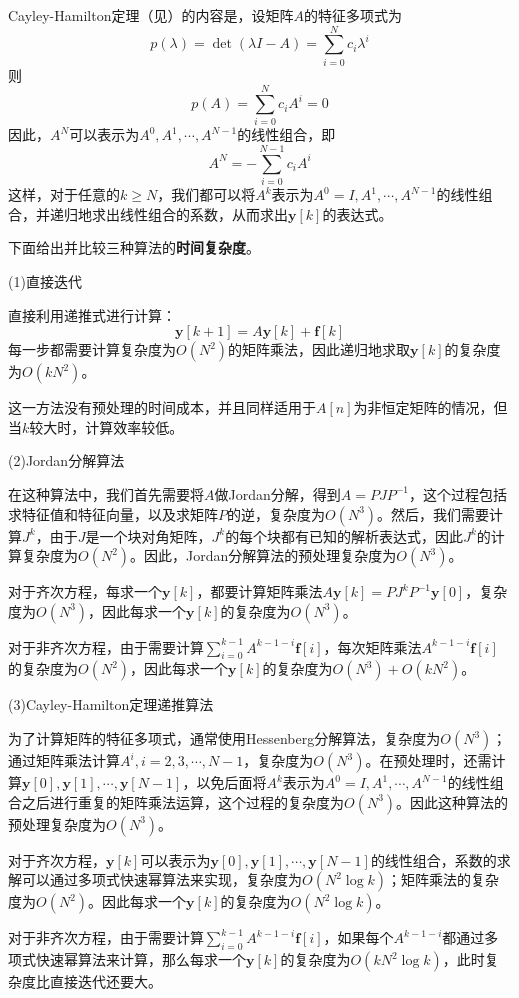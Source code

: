 Cayley-Hamilton定理（见）的内容是，设矩阵$A$的特征多项式为
$$p(\lambda)=\det(\lambda I - A)=\sum_{i=0}^{N} c_i \lambda^i$$
则
$$p(A)=\sum_{i=0}^{N} c_i A^i=0$$
因此，$A^N$可以表示为$A^0,A^1,\cdots,A^{N-1}$的线性组合，即
$$A^N = -\sum_{i=0}^{N-1} c_i A^i$$
这样，对于任意的$k\geq N$，我们都可以将$A^k$表示为$A^0=I,A^1,\cdots,A^{N-1}$的线性组合，并递归地求出线性组合的系数，从而求出$\mathbf{y}[k]$的表达式。

下面给出并比较三种算法的\textbf{时间复杂度}。

(1)直接迭代

直接利用递推式进行计算：
$$\mathbf{y}[k+1] = A \mathbf{y}[k] + \mathbf{f}[k]$$
每一步都需要计算复杂度为$O(N^2)$的矩阵乘法，因此递归地求取$\mathbf{y}[k]$的复杂度为$O(k N^2)$。

这一方法没有预处理的时间成本，并且同样适用于$A[n]$为非恒定矩阵的情况，但当$k$较大时，计算效率较低。

(2)Jordan分解算法

在这种算法中，我们首先需要将$A$做Jordan分解，得到$A=PJP^{-1}$，这个过程包括求特征值和特征向量，以及求矩阵$P$的逆，复杂度为$O(N^3)$。然后，我们需要计算$J^k$，由于$J$是一个块对角矩阵，$J^k$的每个块都有已知的解析表达式，因此$J^k$的计算复杂度为$O(N^2)$。因此，Jordan分解算法的预处理复杂度为$O(N^3)$。

对于齐次方程，每求一个$\mathbf{y}[k]$，都要计算矩阵乘法$A\mathbf{y}[k] = P J^k P^{-1} \mathbf{y}[0]$，复杂度为$O(N^3)$，因此每求一个$\mathbf{y}[k]$的复杂度为$O(N^3)$。

对于非齐次方程，由于需要计算$\sum_{i=0}^{k-1} A^{k-1-i} \mathbf{f}[i]$，每次矩阵乘法$A^{k-1-i} \mathbf{f}[i]$的复杂度为$O(N^2)$，因此每求一个$\mathbf{y}[k]$的复杂度为$O(N^3)+O(k N^2)$。

(3)Cayley-Hamilton定理递推算法

为了计算矩阵的特征多项式，通常使用Hessenberg分解算法，复杂度为$O(N^3)$；通过矩阵乘法计算$A^i,i=2,3,\cdots,N-1$，复杂度为$O(N^3)$。在预处理时，还需计算$\mathbf{y}[0],\mathbf{y}[1],\cdots,\mathbf{y}[N-1]$，以免后面将$A^k$表示为$A^0=I,A^1,\cdots,A^{N-1}$的线性组合之后进行重复的矩阵乘法运算，这个过程的复杂度为$O(N^3)$。因此这种算法的预处理复杂度为$O(N^3)$。

对于齐次方程，$\mathbf{y}[k]$可以表示为$\mathbf{y}[0],\mathbf{y}[1],\cdots,\mathbf{y}[N-1]$的线性组合，系数的求解可以通过多项式快速幂算法来实现，复杂度为$O(N^2 \log k)$；矩阵乘法的复杂度为$O(N^2)$。因此每求一个$\mathbf{y}[k]$的复杂度为$O(N^2 \log k)$。

对于非齐次方程，由于需要计算$\sum_{i=0}^{k-1} A^{k-1-i} \mathbf{f}[i]$，如果每个$A^{k-1-i}$都通过多项式快速幂算法来计算，那么每求一个$\mathbf{y}[k]$的复杂度为$O(k N^2 \log k)$，此时复杂度比直接迭代还要大。

